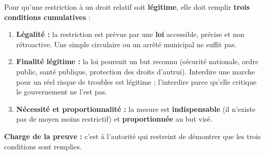 \documentclass[11pt]{article}
\begin{document}
\begin{methode}
Pour qu'une restriction à un droit relatif soit \textbf{légitime}, elle doit remplir \textbf{trois conditions cumulatives} :
\begin{enumerate}
    \item \textbf{Légalité :} la restriction est prévue par une \textbf{loi} accessible, précise et non rétroactive. Une simple circulaire ou un arrêté municipal ne suffit pas.
    \item \textbf{Finalité légitime :} la loi poursuit un but reconnu (sécurité nationale, ordre public, santé publique, protection des droits d'autrui). Interdire une marche pour un réel risque de troubles est légitime ; l'interdire parce qu'elle critique le gouvernement ne l'est pas.
    \item \textbf{Nécessité et proportionnalité :} la mesure est \textbf{indispensable} (il n'existe pas de moyen moins restrictif) et \textbf{proportionnée} au but visé.
\end{enumerate}
\textbf{Charge de la preuve :} c'est à l'autorité qui restreint de démontrer que les trois conditions sont remplies.
\end{methode}
\end{document}
